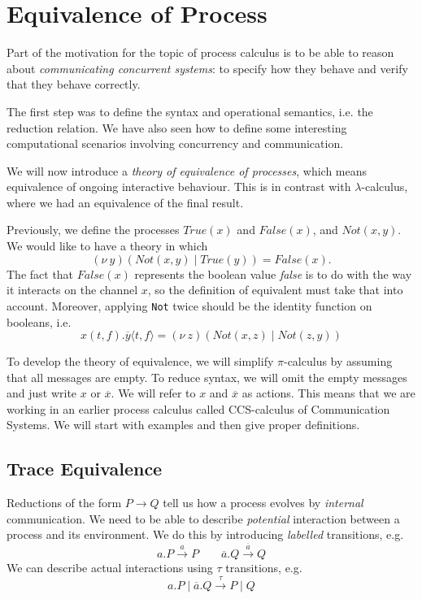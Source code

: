 \documentclass[a4paper, openany]{memoir}
\theoremstyle{definition}
\begin{document}
    \section{Equivalence of Process}
    Part of the motivation for the topic of process calculus is to be able to reason about \emph{communicating concurrent systems}: to specify how they behave and verify that they behave correctly.

    The first step was to define the syntax and operational semantics, i.e. the reduction relation. We have also seen how to define some interesting computational scenarios involving concurrency and communication.

    We will now introduce a \emph{theory of equivalence of processes}, which means equivalence of ongoing interactive behaviour. This is in contrast with $\lambda$-calculus, where we had an equivalence of the final result.

    Previously, we define the processes $\textit{True}(x)$ and $\textit{False}(x)$, and $\textit{Not}(x, y)$. We would like to have a theory in which
    \[(\nu \ y)(\textit{Not}(x, y) \mid \textit{True}(y)) = \textit{False}(x).\]
    The fact that $\textit{False}(x)$ represents the boolean value \textit{false} is to do with the way it interacts on the channel $x$, so the definition of equivalent must take that into account. Moreover, applying \texttt{Not} twice should be the identity function on booleans, i.e.
    \[x(t, f).\overline{y} \langle t, f \rangle = (\nu \ z)(\textit{Not}(x, z) \mid \textit{Not}(z, y))\]

    To develop the theory of equivalence, we will simplify $\pi$-calculus by assuming that all messages are empty. To reduce syntax, we will omit the empty messages and just write $x$ or $\overline{x}$. We will refer to $x$ and $\overline{x}$ as actions. This means that we are working in an earlier process calculus called CCS-calculus of Communication Systems. We will start with examples and then give proper definitions.

    \subsection{Trace Equivalence}
    Reductions of the form $P \to Q$ tell us how a process evolves by \emph{internal} communication. We need to be able to describe \emph{potential} interaction between a process and its environment. We do this by introducing \emph{labelled} transitions, e.g.
    \[a.P \xrightarrow{a} P \qquad \overline{a}.Q \xrightarrow{\overline{a}} Q\]
    We can describe actual interactions using $\tau$ transitions, e.g.
    \[a.P \mid \overline{a}.Q \xrightarrow{\tau} P \mid Q\]
\end{document}
